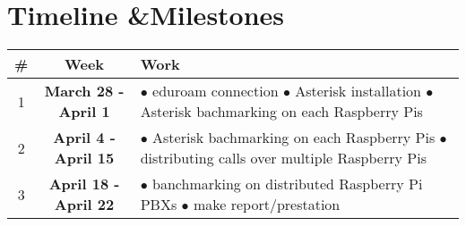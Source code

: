 \section{Timeline \&Milestones}	\label{sec:timeline-milestone}	
	\vspace{1.6pt}
		\begin{tabular}{|| c | c | m{40mm} ||} 
			\hline
			\# & \textbf{Week} & \textbf{Work}\\ \hline \hline
			1 & \textbf{March 28 - April 1} & $\bullet$ eduroam connection  \newline 
			$\bullet$ Asterisk installation \newline
			$\bullet$ Asterisk bachmarking on each Raspberry Pis \\ \hline
			
			2 & \textbf{April 4 - April 15} & $\bullet$ Asterisk bachmarking on each Raspberry Pis \newline 
			$\bullet$ distributing calls over multiple Raspberry Pis\\ \hline
			
			3 & \textbf{April 18 - April 22} & $\bullet$ banchmarking on distributed Raspberry Pi PBXs \newline 
			$\bullet$ make report/prestation \\ \hline
		\end{tabular}